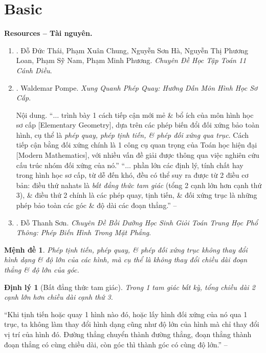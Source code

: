 \documentclass{article}
\newtheorem{dinhly}{Định lý}
\newtheorem{menhde}{Mệnh đề}
\begin{document}
\section{Basic}
\textbf{\textsf{Resources -- Tài nguyên.}}
\begin{enumerate}
	\item \cite{CDHT_Toan_11_CD}. {\sc Đỗ Đức Thái, Phạm Xuân Chung, Nguyễn Sơn Hà, Nguyễn Thị Phương Loan, Phạm Sỹ Nam, Phạm Minh Phương}. {\it Chuyên Đề Học Tập Toán 11 Cánh Diều}.
	\item \cite{Pompe_phep_quay}. {\sc Waldemar Pompe}. {\it Xung Quanh Phép Quay: Hướng Dẫn Môn Hình Học Sơ Cấp}.
	
	{\sf Nội dung.} ``$\ldots$ trình bày 1 cách tiếp cận mới mẻ \& bổ ích của môn hình học sơ cấp [Elementary Geometry], dựa trên các phép biến đổi đối xứng bảo toàn hình, cụ thể là {\it phép quay, phép tịnh tiến, \& phép đối xứng qua trục}. Cách tiếp cận bằng đối xứng chính là 1 công cụ quan trọng của Toán học hiện đại [Modern Mathematics], với nhiều vấn đề giải được thông qua việc nghiên cứu cấu trúc nhóm đối xứng của nó.'' ``$\ldots$ phần lớn các định lý, tính chất hay trong hình học sơ cấp, từ dễ đến khó, đều có thể suy ra được từ 2 điều cơ bản: điều thứ nahats là {\it bất đẳng thức tam giác} (tổng 2 cạnh lớn hơn cạnh thứ 3), \& điều thứ 2 chính là các phép quay, tịnh tiến, \& đối xứng trục là những phép bảo toàn các góc \& độ dài các đoạn thẳng.'' -- \cite[Lời giới thiệu]{Pompe_phep_quay}
	\item \cite{Son_phep_bien_hinh_2D}. {\sc Đỗ Thanh Sơn}. {\it Chuyên Đề Bồi Dưỡng Học Sinh Giỏi Toán Trung Học Phổ Thông: Phép Biến Hình Trong Mặt Phẳng}.
\end{enumerate}

\begin{menhde}
	Phép tịnh tiến, phép quay, \& phép đối xứng trục không thay đổi hình dạng \& độ lớn của các hình, mà cụ thể là không thay đổi chiều dài đoạn thẳng \& độ lớn của góc.
\end{menhde}

\begin{dinhly}[Bất đẳng thức tam giác]
	Trong 1 tam giác bất kỳ, tổng chiều dài 2 cạnh lớn hơn chiều dài cạnh thứ 3.
\end{dinhly}
``Khi tịnh tiến hoặc quay 1 hình nào đó, hoặc lấy hình đối xứng của nó qua 1 trục, ta không làm thay đổi hình dạng cũng như độ lớn của hình mà chỉ thay đổi vị trí của hình đó. Đường thẳng chuyển thành đường thẳng, đoạn thẳng thành đoạn thẳng có cùng chiều dài, còn góc thì thành góc có cùng độ lớn.'' -- \cite[p. 10]{Pompe_phep_quay}
\end{document}
